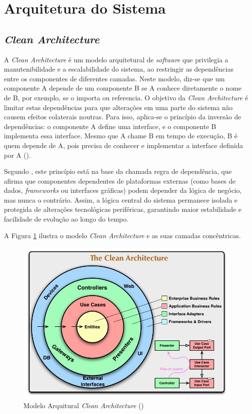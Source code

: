 \section{Arquitetura do Sistema} 

\subsection{\textit{Clean Architecture}}

A \textit{Clean Architecture} é um modelo arquitetural de \textit{software} que privilegia a manutenibilidade e a escalabilidade do sistema, ao restringir as dependências entre os componentes de diferentes camadas. Neste modelo, diz-se que um componente A depende de um componente B se A conhece diretamente o nome de B, por exemplo, se o importa ou referencia. O objetivo da \textit{Clean Architecture} é limitar estas dependências para que alterações em uma parte do sistema não causem efeitos colaterais noutras. Para isso, aplica-se o princípio da inversão de dependências: o componente A define uma interface, e o componente B implementa essa interface. Mesmo que A chame B em tempo de execução, B é quem depende de A, pois precisa de conhecer e implementar a interface definida por A (\cite{Lano2023}).

Segundo \cite{Lano2023}, este princípio está na base da chamada regra de dependência, que afirma que componentes dependentes de plataformas externas (como bases de dados, \textit{frameworks} ou interfaces gráficas) podem depender da lógica de negócio, mas nunca o contrário. Assim, a lógica central do sistema permanece isolada e protegida de alterações tecnológicas periféricas, garantindo maior estabilidade e facilidade de evolução ao longo do tempo.

A Figura \ref{fig:cleanArchitecture} ilustra o modelo \textit{Clean Architecture} e as suas camadas concêntricas.

\begin{figure}[H]
    \centering
    \includegraphics[width=\linewidth,keepaspectratio]{frontmatter/assets/models/CleanArchitecture.jpg}
    \caption{Modelo Arquitural \textit{Clean Architecture} (\cite{Martin2012})}
    \label{fig:cleanArchitecture}
\end{figure}

